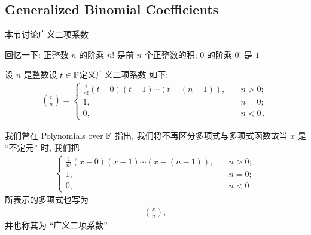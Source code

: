 \subsection*{Generalized Binomial Coefficients}

本节讨论广义二项系数\period

回忆一下: 正整数 $n$ 的阶乘 $n!$ 是前 $n$ 个正整数的积; $0$ 的阶乘 $0!$ 是 $1$\period

\begin{definition}
    设 $n$ 是整数\period 设 $t \in \mathbb{F}$\period 定义广义二项系数  如下:
    \begin{align*}
        \binom{t}{n} = \begin{cases}
            \frac{1}{n!} (t - 0)(t - 1) \cdots (t - (n - 1)), & \quad n > 0;        \\
            1,                                                & \quad n = 0;        \\
            0,                                                & \quad n < 0 \period
        \end{cases}
    \end{align*}
\end{definition}

\begin{remark}
    我们曾在 Polynomials over $\mathbb{F}$ 指出, 我们将不再区分多项式与多项式函数\period 故当 $x$ 是 ``不定元'' 时, 我们把
    \begin{align*}
        \begin{cases}
            \frac{1}{n!} (x - 0)(x - 1) \cdots (x - (n - 1)), & \quad n > 0; \\
            1,                                                & \quad n = 0; \\
            0,                                                & \quad n < 0
        \end{cases}
    \end{align*}
    所表示的多项式也写为
    \begin{align*}
        \binom{x}{n},
    \end{align*}
    并也称其为 ``广义二项系数''\period
\end{remark}
